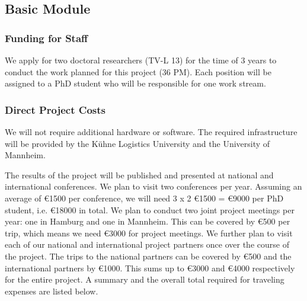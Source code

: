  \subsection{Basic Module}

\subsubsection{Funding for Staff}
\label{sec:staff}

We apply for two doctoral researchers (TV-L 13) for the time of 3 years to conduct the work planned for this project (36 PM). Each position will be assigned to a PhD student who will be responsible for one work stream.

\begin{funds}
\end{funds}

\subsubsection{Direct Project Costs}


We will not require additional hardware or software. The required infrastructure will be provided by the K\"uhne Logistics University and the University of Mannheim.

\label{sec:costs:travel}
The results of the project will be published and presented at national and international conferences. We plan to visit two conferences per year. Assuming an average of \euro1500 per conference, we will need 3 x 2 \euro1500 = \euro9000 per PhD student, i.e. \euro18000 in total. We plan to conduct two joint project meetings per year: one in Hamburg and one in Mannheim. This can be covered by \euro500 per trip, which means we need \euro3000 for project meetings. We further plan to visit each of our national and international project partners once over the course of the project. The trips to the national partners can be covered by \euro500 and the international partners by \euro1000. This sums up to \euro3000 and \euro4000 respectively for the entire project. A summary and the overall total required for traveling expenses are listed below. \\


